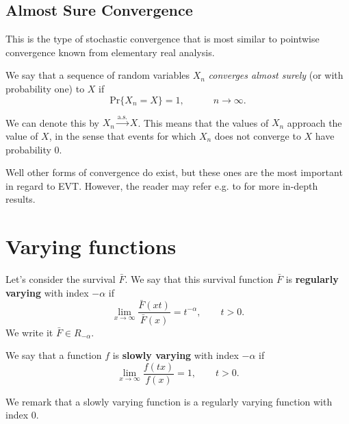 \subsection*{Almost Sure Convergence} 

This is the type of stochastic convergence that is most similar to pointwise convergence known from elementary real analysis.

\begin{definition}
We say that a sequence of random variables $X_n$ \emph{converges almost surely} (or with probability one) to $X$ if 
\begin{equation}
\text{Pr}\Big\{X_n=X\Big\}=1, \quad\qquad n\to\infty.
\end{equation}
\end{definition}
We can denote this by $X_n\stackrel{\text{a.s.}}{\rightarrow} X$. This means that the values of $X_n$ approach the value of $X$, in the sense that events for which $X_n$ does not converge to $X$ have probability 0.


Well other forms of convergence do exist, but these ones are the most important in regard to EVT. However, the reader may refer e.g. to \citet{lafaye_understanding_2009}  for more in-depth results.

\section{Varying functions}\label{app:varying}

\begin{definition}
Let's consider the survival $\bar{F}$. We say that this survival function $\bar{F}$ is \textbf{regularly varying} with index $-\alpha$ if
\begin{equation}
\displaystyle{\lim_{x \to \infty}} \frac{\bar{F}(xt)}{\bar{F}(x)}=t^{-\alpha}, \qquad t>0. 
\end{equation}
We write it $\bar{F}\in R_{-\alpha}$.
\end{definition}

\begin{definition}
We say that a function $f$ is \textbf{slowly varying} with index $-\alpha$ if
\begin{equation}
\displaystyle{\lim_{x \to \infty}} \frac{f(t x)}{f(x)}=1, \qquad t>0. 
\end{equation}
\end{definition}
We remark that a slowly varying function is a regularly varying function with index 0.



